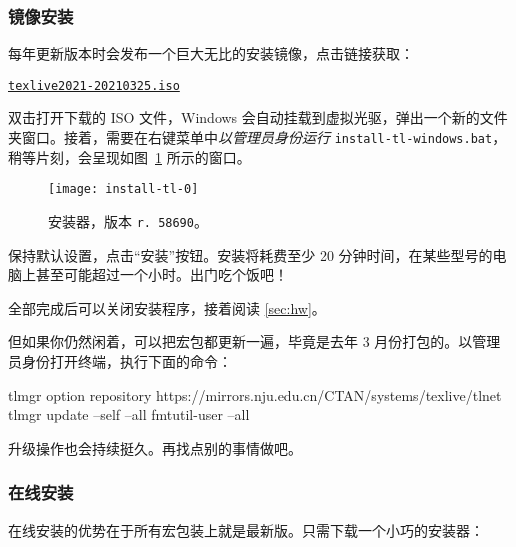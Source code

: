 \subsubsection{镜像安装}
\label{subsubsec:tl-from-iso}

\begin{widepar}
每年更新版本时会发布一个巨大无比的安装镜像，点击链接获取：
\end{widepar}

\medskip
\href{https://mirrors.nju.edu.cn/CTAN/systems/texlive/Images/texlive2021-20210325.iso}{\faFile*[regular] \texttt{texlive2021-20210325.iso}}
\medskip

双击打开下载的 ISO 文件，Windows 会自动挂载到虚拟光驱，弹出一个新的文件夹窗口。接着，需要在右键菜单中\emph{以管理员身份运行} \texttt{install-tl-windows.bat}，稍等片刻，会呈现如图~\ref{fig:install-tl-0} 所示的窗口。

\begin{figure}[htbp]
  \texttt{[image: install-tl-0]}
  \caption{安装器，版本 \texttt{r. 58690}。}
  \label{fig:install-tl-0}
\end{figure}

保持默认设置，点击“安装”按钮。安装将耗费至少 20 分钟时间，在某些型号的电脑上甚至可能超过一个小时。出门吃个饭吧！

全部完成后可以关闭安装程序，接着阅读 \ref{sec:hw}。

但如果你仍然闲着，可以把宏包都更新一遍，毕竟是去年 3 月份打包的。以管理员身份打开终端，执行下面的命令：

\begin{shellexample}[morekeywords={tlmgr,fmtutil}]
  tlmgr option repository https://mirrors.nju.edu.cn/CTAN/systems/texlive/tlnet
  tlmgr update --self --all
  fmtutil-user --all
\end{shellexample}

升级操作也会持续挺久。再找点别的事情做吧。

\subsubsection{在线安装}
\label{subsubsec:tl-from-net}

\begin{widepar}
在线安装的优势在于所有宏包装上就是最新版。只需下载一个小巧的安装器：
\end{widepar}


